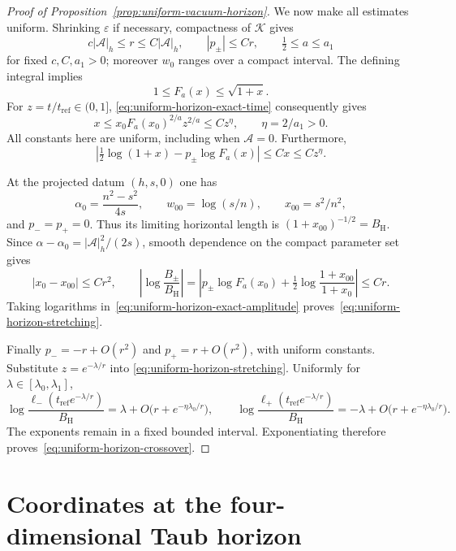 \documentclass[10pt,a4paper]{article}
\numberwithin{equation}{section}
\theoremstyle{definition}
\theoremstyle{remark}
\begin{document}
\begin{proof}[Proof of Proposition~\ref{prop:uniform-vacuum-horizon}]
We now make all estimates uniform.  Shrinking $\varepsilon$ if
necessary, compactness of $\mathcal K$ gives
\[
 c|\mathcal A|_h\le r\le C|\mathcal A|_h,\qquad
 |p_\pm|\le Cr,\qquad \tfrac12\le a\le a_1
\]
for fixed $c,C,a_1>0$; moreover $w_0$ ranges over a compact interval.
The defining integral implies
\[
 1\le F_a(x)\le\sqrt{1+x}.
\]
For $z=t/t_{\mathrm{ref}}\in(0,1]$,
\eqref{eq:uniform-horizon-exact-time} consequently gives
\[
 x\le x_0F_a(x_0)^{2/a}z^{2/a}\le C z^\eta,
 \qquad \eta=2/a_1>0.
\]
All constants here are uniform, including when $\mathcal A=0$.
Furthermore,
\[
 \left|\tfrac12\log(1+x)-p_\pm\log F_a(x)\right|
 \le Cx\le Cz^\eta.
\]

At the projected datum $(h,s,0)$ one has
\[
 \alpha_0=\frac{n^2-s^2}{4s},\qquad
 w_{00}=\log(s/n),\qquad
 x_{00}=s^2/n^2,
\]
and $p_-=p_+=0$.  Thus its limiting horizontal length is
$(1+x_{00})^{-1/2}=B_{\mathrm H}$.
Since $\alpha-\alpha_0=|\mathcal A|_h^2/(2s)$,
smooth dependence on the compact parameter set gives
\[
 |x_0-x_{00}|\le Cr^2,\qquad
 \left|\log\frac{B_\pm}{B_{\mathrm H}}\right|
 =\left|p_\pm\log F_a(x_0)
       +\tfrac12\log\frac{1+x_{00}}{1+x_0}\right|
 \le Cr.
\]
Taking logarithms in~\eqref{eq:uniform-horizon-exact-amplitude}
proves~\eqref{eq:uniform-horizon-stretching}.

Finally $p_-=-r+O(r^2)$ and $p_+=r+O(r^2)$, with uniform
constants.  Substitute $z=e^{-\lambda/r}$ into
\eqref{eq:uniform-horizon-stretching}.  Uniformly for
$\lambda\in[\lambda_0,\lambda_1]$,
\[
 \log\frac{\ell_-(t_{\mathrm{ref}}e^{-\lambda/r})}
                {B_{\mathrm H}}
       =\lambda+O\bigl(r+e^{-\eta\lambda_0/r}\bigr),\qquad
 \log\frac{\ell_+(t_{\mathrm{ref}}e^{-\lambda/r})}
                {B_{\mathrm H}}
       =-\lambda+O\bigl(r+e^{-\eta\lambda_0/r}\bigr).
\]
The exponents remain in a fixed bounded interval.  Exponentiating
therefore proves~\eqref{eq:uniform-horizon-crossover}.
\end{proof}

\section{Coordinates at the four-dimensional Taub horizon}
\label{app:taub-coordinates}
\end{document}
